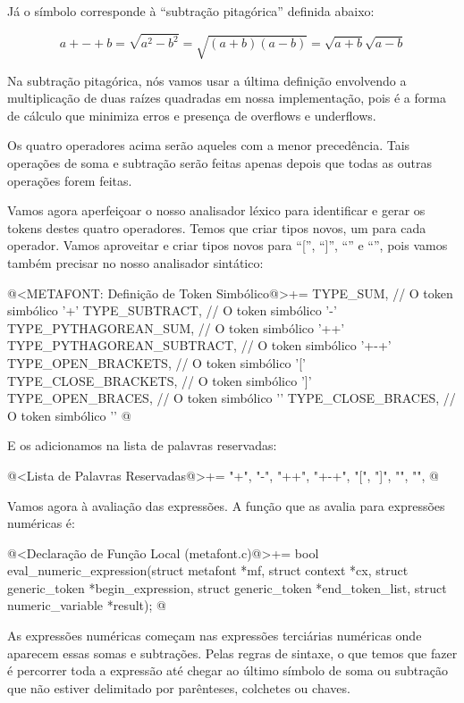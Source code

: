 Já o símbolo \monoespaco{+-+} corresponde à ``subtração pitagórica''
definida abaixo:

$$
a +-+ b = \sqrt{a^2 - b^2} = \sqrt{(a+b)(a-b)} = \sqrt{a+b}\sqrt{a-b}
$$

Na subtração pitagórica, nós vamos usar a última definição envolvendo
a multiplicação de duas raízes quadradas em nossa implementação, pois
é a forma de cálculo que minimiza erros e presença de overflows e
underflows.

Os quatro operadores acima serão aqueles com a menor precedência. Tais
operações de soma e subtração serão feitas apenas depois que todas as
outras operações forem feitas.

Vamos agora aperfeiçoar o nosso analisador léxico para identificar e
gerar os tokens destes quatro operadores. Temos que criar tipos novos,
um para cada operador. Vamos aproveitar e criar tipos novos para
``['', ``]'', ``{'' e ``}'', pois vamos também precisar no nosso
analisador sintático:

\iniciocodigo
@<METAFONT: Definição de Token Simbólico@>+=
TYPE_SUM,                   // O token simbólico '+'
TYPE_SUBTRACT,              // O token simbólico '-'
TYPE_PYTHAGOREAN_SUM,       // O token simbólico '++'
TYPE_PYTHAGOREAN_SUBTRACT,  // O token simbólico '+-+'
TYPE_OPEN_BRACKETS,         // O token simbólico '['
TYPE_CLOSE_BRACKETS,        // O token simbólico ']'
TYPE_OPEN_BRACES,           // O token simbólico '{'
TYPE_CLOSE_BRACES,          // O token simbólico '}'
@
\fimcodigo

E os adicionamos na lista de palavras reservadas:

\iniciocodigo
@<Lista de Palavras Reservadas@>+=
"+", "-", "++", "+-+", "[", "]", "{", "}",
@
\fimcodigo


Vamos agora à avaliação das expressões. A função que as avalia para
expressões numéricas é:

\iniciocodigo
@<Declaração de Função Local (metafont.c)@>+=
bool eval_numeric_expression(struct metafont *mf, struct context *cx,
                             struct generic_token *begin_expression,
                             struct generic_token *end_token_list,
                             struct numeric_variable *result);
@
\fimcodigo


As expressões numéricas começam nas expressões terciárias numéricas
onde aparecem essas somas e subtrações. Pelas regras de sintaxe, o que
temos que fazer é percorrer toda a expressão até chegar ao último
símbolo de soma ou subtração que não estiver delimitado por
parênteses, colchetes ou chaves.


